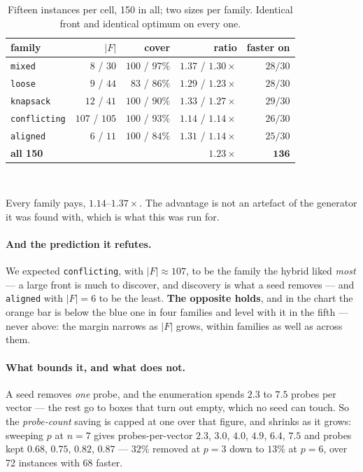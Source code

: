 \documentclass[11pt,a4paper]{article}
\begin{document}
\begin{table}[h]
\centering
\caption{Fifteen instances per cell, 150 in all; two sizes per family.
Identical front and identical optimum on every one.}
\begin{tabular}{lrrrr}
\toprule
family & $|F|$ & cover & ratio & faster on \\
\midrule
\texttt{mixed}       & $8$ / $30$    & $100$ / $97\%$ & $\mathbf{1.37}$ / $1.30\times$ & $28/30$ \\
\texttt{loose}       & $9$ / $44$    & $83$ / $86\%$  & $1.29$ / $1.23\times$ & $28/30$ \\
\texttt{knapsack}    & $12$ / $41$   & $100$ / $90\%$ & $1.33$ / $1.27\times$ & $29/30$ \\
\texttt{conflicting} & $107$ / $105$ & $100$ / $93\%$ & $1.14$ / $1.14\times$ & $26/30$ \\
\texttt{aligned}     & $6$ / $11$    & $100$ / $84\%$ & $1.31$ / $1.14\times$ & $25/30$ \\
\midrule
\textbf{all 150} & & & $\mathbf{1.23\times}$ & $\mathbf{136}$ \\
\bottomrule
\end{tabular}
\end{table}

\begin{center}
\\[2pt]
\end{center}

\noindent
Every family pays, $1.14$--$1.37\times$.  The advantage is not an artefact of
the generator it was found with, which is what this was run for.

\paragraph{And the prediction it refutes.}  We expected \texttt{conflicting},
with $|F| \approx 107$, to be the family the hybrid liked \emph{most} --- a
large front is much to discover, and discovery is what a seed removes --- and
\texttt{aligned} with $|F| = 6$ to be the least.  \textbf{The opposite holds},
and in the chart the orange bar is below the blue one in four families and
level with it in the fifth --- never above: the margin narrows as $|F|$ grows,
within families as well as across them.

\paragraph{What bounds it, and what does not.}  A seed removes \emph{one}
probe, and the enumeration spends $2.3$ to $7.5$ probes per vector --- the rest
go to boxes that turn out empty, which no seed can touch.  So the
\emph{probe-count} saving is capped at one over that figure, and shrinks as it
grows: sweeping $p$ at $n=7$ gives probes-per-vector $2.3$, $3.0$, $4.0$,
$4.9$, $6.4$, $7.5$ and probes kept $0.68$, $0.75$, $0.82$, $0.87$ --- $32\%$
removed at $p=3$ down to $13\%$ at $p=6$, over 72 instances with 68 faster.
\end{document}
